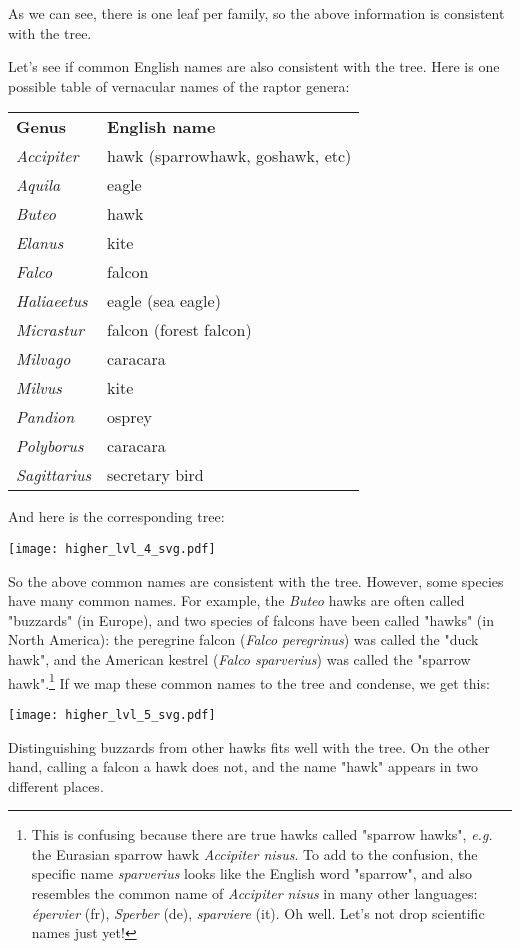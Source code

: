 \bigskip{}
\noindent{}As we can see, there is one leaf per family, so the above
information is consistent with the tree.

Let's see if common English names are also consistent with the tree. Here is
one possible table of vernacular names of the raptor genera: 

\bigskip{}
\begin{tabular}{ll}
\textbf{Genus} & \textbf{English name} \\
\textit{Accipiter} & hawk (sparrowhawk, goshawk, etc)\\
\textit{Aquila} & eagle  \\
\textit{Buteo} & hawk \\
\textit{Elanus} & kite \\
\textit{Falco} & falcon \\
\textit{Haliaeetus} & eagle (sea eagle) \\
\textit{Micrastur} & falcon (forest falcon)\\
\textit{Milvago} & caracara \\
\textit{Milvus} & kite \\
\textit{Pandion} & osprey \\
\textit{Polyborus} & caracara \\
\textit{Sagittarius} & secretary bird
\end{tabular}
\bigskip{}

And here is the corresponding tree:


\texttt{[image: higher\_lvl\_4\_svg.pdf]}
\bigskip{}

So the above common names are consistent with the tree. However, some species
have many common names. For example, the \textit{Buteo} hawks are often called
"buzzards" (in Europe), and two species of falcons have been called "hawks" (in
North America): the peregrine falcon (\textit{Falco peregrinus}) was called the
"duck hawk", and the American kestrel (\textit{Falco sparverius}) was called
the "sparrow hawk".\footnote{This is confusing because there are true hawks
called "sparrow hawks", \emph{e.g.} the Eurasian sparrow hawk \textit{Accipiter
nisus}. To add to the confusion, the specific name \textit{sparverius} looks
like the English word "sparrow", and also resembles the common name of
\textit{Accipiter nisus} in many other languages: \textit{\'{e}pervier} (fr), \textit{Sperber} (de), \textit{sparviere} (it). Oh well. Let's not drop scientific names just yet!} If we
map these common names to the tree and condense, we get this:


\texttt{[image: higher\_lvl\_5\_svg.pdf]}
\bigskip{}

\noindent{}Distinguishing buzzards from other hawks fits well with the tree. On
the other hand, calling a falcon a hawk does not, and the name "hawk" appears
in two different places.
